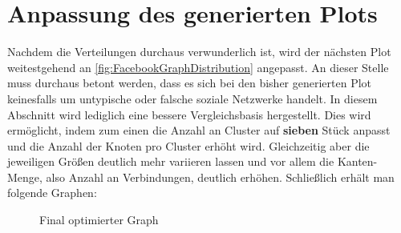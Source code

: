 \section{Anpassung des generierten Plots}
Nachdem die Verteilungen durchaus verwunderlich ist, wird der nächsten Plot weitestgehend an \ref{fig:FacebookGraphDistribution} angepasst. An dieser Stelle muss durchaus betont werden, dass es sich bei den bisher generierten Plot keinesfalls um untypische oder falsche soziale Netzwerke handelt. In diesem Abschnitt wird lediglich eine bessere Vergleichsbasis hergestellt. Dies wird ermöglicht, indem zum einen die Anzahl an Cluster auf \textbf{sieben} Stück anpasst und die Anzahl der Knoten pro Cluster erhöht wird. Gleichzeitig aber die jeweiligen Größen deutlich mehr variieren lassen und vor allem die Kanten-Menge, also Anzahl an Verbindungen, deutlich erhöhen. Schließlich erhält man folgende Graphen: 

\FloatBarrier
\begin{figure}[h!]%
  \centering
  \qquad
  \caption{Final optimierter Graph}
  \label{fig:ourGraphFinalPlot}
\end{figure}
\FloatBarrier

